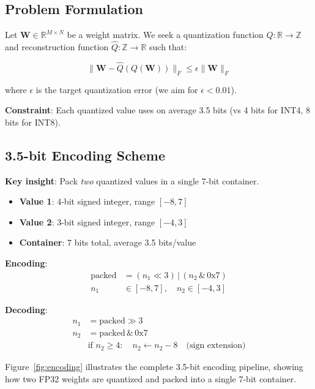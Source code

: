 \documentclass{article}
\begin{document}
\subsection{Problem Formulation}

Let $\mathbf{W} \in \mathbb{R}^{M \times N}$ be a weight matrix. We seek a quantization function $Q: \mathbb{R} \to \mathbb{Z}$ and reconstruction function $\hat{Q}: \mathbb{Z} \to \mathbb{R}$ such that:

\begin{equation}
    \|\mathbf{W} - \hat{Q}(Q(\mathbf{W}))\|_F \leq \epsilon \|\mathbf{W}\|_F
\end{equation}

where $\epsilon$ is the target quantization error (we aim for $\epsilon < 0.01$).

\textbf{Constraint}: Each quantized value uses on average 3.5 bits (vs 4 bits for INT4, 8 bits for INT8).

\subsection{3.5-bit Encoding Scheme}

\textbf{Key insight}: Pack \emph{two} quantized values in a single 7-bit container.

\begin{itemize}
    \item \textbf{Value 1}: 4-bit signed integer, range $[-8, 7]$
    \item \textbf{Value 2}: 3-bit signed integer, range $[-4, 3]$
    \item \textbf{Container}: 7 bits total, average 3.5 bits/value
\end{itemize}

\textbf{Encoding}:
\begin{align}
    \text{packed} &= (n_1 \ll 3) \,|\, (n_2 \,\&\, 0\text{x}7) \\
    n_1 &\in [-8, 7], \quad n_2 \in [-4, 3]
\end{align}

\textbf{Decoding}:
\begin{align}
    n_1 &= \text{packed} \gg 3 \\
    n_2 &= \text{packed} \,\&\, 0\text{x}7 \\
    &\text{if } n_2 \geq 4: \quad n_2 \gets n_2 - 8 \quad \text{(sign extension)}
\end{align}

Figure~\ref{fig:encoding} illustrates the complete 3.5-bit encoding pipeline, showing how two FP32 weights are quantized and packed into a single 7-bit container.
\end{document}
